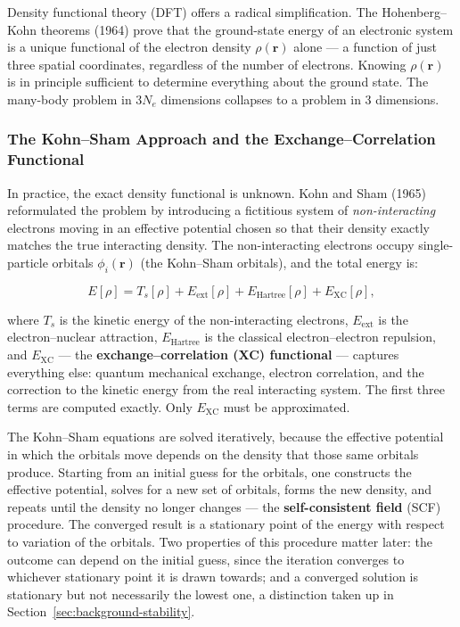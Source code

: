 Density functional theory (DFT) offers a radical simplification. The
Hohenberg--Kohn theorems (1964) prove that the ground-state energy of an
electronic system is a unique functional of the electron density
$\rho(\mathbf{r})$ alone --- a function of just three spatial coordinates,
regardless of the number of electrons. Knowing $\rho(\mathbf{r})$ is in principle
sufficient to determine everything about the ground state. The many-body problem
in $3N_e$ dimensions collapses to a problem in 3 dimensions.

\subsubsection{The Kohn--Sham Approach and the Exchange--Correlation Functional}

In practice, the exact density functional is unknown. Kohn and Sham (1965)
reformulated the problem by introducing a fictitious system of \emph{non-interacting}
electrons moving in an effective potential chosen so that their density exactly
matches the true interacting density. The non-interacting electrons occupy
single-particle orbitals $\phi_i(\mathbf{r})$ (the Kohn--Sham orbitals), and
the total energy is:

\begin{equation}
  E[\rho] = T_s[\rho] + E_\text{ext}[\rho] + E_\text{Hartree}[\rho]
            + E_\text{XC}[\rho],
\end{equation}

where $T_s$ is the kinetic energy of the non-interacting electrons, $E_\text{ext}$
is the electron--nuclear attraction, $E_\text{Hartree}$ is the classical
electron--electron repulsion, and $E_\text{XC}$ --- the
\textbf{exchange--correlation (XC) functional} --- captures everything else:
quantum mechanical exchange, electron correlation, and the correction to the
kinetic energy from the real interacting system. The first three terms are computed
exactly. Only $E_\text{XC}$ must be approximated.

The Kohn--Sham equations are solved iteratively, because the effective potential
in which the orbitals move depends on the density that those same orbitals
produce. Starting from an initial guess for the orbitals, one constructs the
effective potential, solves for a new set of orbitals, forms the new density, and
repeats until the density no longer changes --- the \textbf{self-consistent
field} (SCF) procedure. The converged result is a stationary point of the energy
with respect to variation of the orbitals. Two properties of this procedure
matter later: the outcome can depend on the initial guess, since the iteration
converges to whichever stationary point it is drawn towards; and a converged
solution is stationary but not necessarily the lowest one, a distinction taken up
in Section~\ref{sec:background-stability}.

